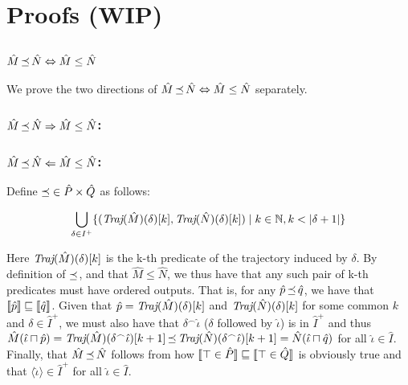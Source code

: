 \section{Proofs (WIP)}

\subsection{$\hat M \operatorname{\mathrel{\preceq}} \hat N \Leftrightarrow \hat M \leq \hat N$}

We prove the two directions of $\hat M \operatorname{\mathrel{\preceq}} \hat N \Leftrightarrow \hat M \leq \hat N$ separately.

\subsubsection{$\hat M \operatorname{\mathrel{\preceq}} \hat N \Rightarrow \hat M \leq \hat N$:} 

\subsubsection{$\hat M \operatorname{\mathrel{\preceq}} \hat N \Leftarrow \hat M \leq \hat N$:} Define $\operatorname{\mathrel{\preceq}} \in \hat P \times \hat Q$ as follows:

\begin{equation*}
\bigcup_{\delta \in I^{+}} \{ (\textit{Traj}(\hat M)(\delta)[k], \textit{Traj}(\hat N)(\delta)[k]) \mid k \in \mathbb{N}, k < | \delta + 1 | \}
\end{equation*}

\noindent Here $\textit{Traj}(\hat M)(\delta)[k]$ is the k-th predicate of the trajectory induced by $\delta$. By definition of $\operatorname{\mathrel{\preceq}}$, and that $\hat M \leq \hat N$, we thus have that any such pair of k-th predicates must have ordered outputs. That is, for any $\hat p \operatorname{\mathrel{\preceq}} \hat q$, we have that $\llbracket\hat p\rrbracket \sqsubseteq \llbracket\hat q\rrbracket$. Given that $\hat p = \textit{Traj}(\hat M)(\delta)[k]$ and $\textit{Traj}(\hat N)(\delta)[k]$ for some common $k$ and $\delta \in \hat I^{+}$, we must also have that $\delta^{\frown}\hat \iota$ ($\delta$ followed by $\hat \iota$) is in $\hat I^{+}$ and thus $\hat M(\hat \iota \sqcap \hat p) = \textit{Traj}(\hat M)(\delta^{\frown}\hat \iota)[k+1] \operatorname{\mathrel{\preceq}} \textit{Traj}(\hat N)(\delta^{\frown}\hat \iota)[k+1] = \hat N(\hat \iota \sqcap \hat q)$ for all $\hat \iota \in \hat I$. Finally, that $\hat M \operatorname{\mathrel{\preceq}} \hat N$ follows from how $\llbracket\top \in \hat P\rrbracket \sqsubseteq \llbracket\top \in \hat Q\rrbracket$ is obviously true and that $\langle \hat \iota \rangle \in \hat I^{+}$ for all $\hat \iota \in \hat I$.

